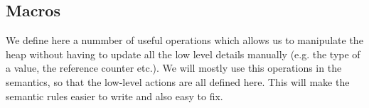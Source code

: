 \documentclass{article}
\begin{document}
\begin{kdefinition}
\begin{module}{}
\begin{syntaxBlock}{}
\end{syntaxBlock}
\begin{kblock}[text]
 \subsection{Macros} 
		We define here a nummber of useful operations which allows us to manipulate the heap 
		without having to update all the low level details manually (e.g. the type of a value, 
		the reference counter etc.). 
		We will mostly use this operations in the semantics, so that the low-level actions 
		are all defined here. This will make the semantic rules easier to write and also easy
		to fix. \end{kblock}

\begin{syntaxBlock}{}
\end{syntaxBlock}


\end{module}
\end{kdefinition}
\end{document}
